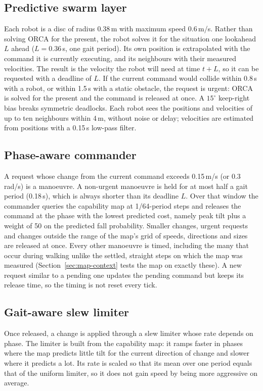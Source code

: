 \documentclass[pdflatex,sn-mathphys-num]{sn-jnl}
\begin{document}
\subsection{Predictive swarm layer}
Each robot is a disc of radius 0.38\,m with maximum speed 0.6\,m/s.
Rather than solving ORCA for the present, the robot solves it for the situation one lookahead $L$ ahead
($L = 0.36$\,s, one gait period). Its own position is extrapolated with the command it is currently executing,
and its neighbours with their measured velocities. The result is the velocity the robot will need at time
$t + L$, so it can be requested with a deadline of $L$. If the current command would collide within 0.8\,s
with a robot, or within 1.5\,s with a static obstacle, the request is urgent: ORCA is solved for the present
and the command is released at once. A $15^\circ$ keep-right bias breaks symmetric deadlocks.
Each robot sees the positions and velocities of up to ten neighbours within 4\,m, without noise or delay;
velocities are estimated from positions with a 0.15\,s low-pass filter.

\subsection{Phase-aware commander}
A request whose change from the current command exceeds 0.15\,m/s (or 0.3\,rad/s) is a manoeuvre. A
non-urgent manoeuvre is held for at most half a gait period (0.18\,s), which is always shorter than its
deadline $L$. Over that window the commander queries the capability map at 1/64-period steps and releases
the command at the phase with the lowest predicted cost, namely peak tilt plus a weight of 50 on the
predicted fall probability. Smaller changes, urgent requests and changes outside the range of the map's
grid of speeds, directions and sizes are released at once. Every other manoeuvre is timed, including the
many that occur during walking unlike the settled, straight steps on which the map was measured
(Section~\ref{sec:map-context} tests the map on exactly these). A new request similar to a pending one
updates the pending command but keeps its release time, so the timing is not reset every tick.

\subsection{Gait-aware slew limiter}
Once released, a change is applied through a slew limiter whose rate
depends on phase. The limiter is built from the capability map: it ramps faster in phases where the map
predicts little tilt for the current direction of change and slower where it predicts a lot. Its rate is
scaled so that its mean over one period equals that of the uniform limiter, so it does not gain speed by
being more aggressive on average.
\end{document}
